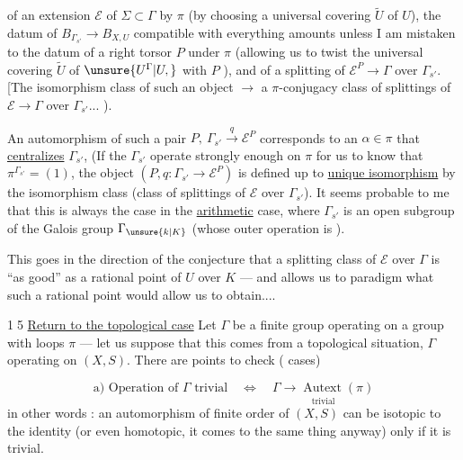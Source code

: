 
of an extension $\mathcal E$ of $\Sigma\subset\Gamma$ by $\pi$ (by choosing a universal covering $\widetilde U$ of $U$), the datum of $B_{\Gamma_{s'}}\longrightarrow B_{X,U}$ compatible with everything amounts unless I am mistaken to the datum of a right torsor $P$ under $\pi$ (allowing us to twist the  universal covering $\widetilde U$ of $\unsure{U^\Gamma|U,}$ with $P$  ), and of a splitting of $\mathcal E^P\longrightarrow\Gamma$ over $\Gamma_{s'}$.
[The isomorphism class of such an object $\longrightarrow$ a $\pi$-conjugacy class of splittings of $\mathcal E\longrightarrow\Gamma$ over $\Gamma_{s'}$... ).

An automorphism of such a pair  $P,\ \Gamma_{s'}\xrightarrow{q}\mathcal E^P$ corresponds to an $\alpha\in\pi$ that \uline{centralizes} $\Gamma_{s'}$,  (If the $\Gamma_{s'}$ operate strongly enough on $\pi$ for us to know that $\pi^{\Gamma_{s'}}=(1)$, the object $(P,q:\Gamma_{s'}\longrightarrow\mathcal E^P)$ is defined up to \uline{unique isomorphism} by the isomorphism class  (class of splittings of $\mathcal E$ over $\Gamma_{s'}$).
It seems probable to me that this is always the case in the \uline{arithmetic} case, where $\Gamma_{s'}$ is an open subgroup of the Galois group $\Gamma_{\unsure{k|K}}$ (whose outer operation is ).


This goes in the direction of the conjecture that a splitting class of $\mathcal E$ over $\Gamma$ is ``as good'' as a rational point of $U$ over $K$ --- and allows us to paradigm what such a rational point would allow us to obtain....

\textcircled{15} \uline{Return to the topological case} Let $\Gamma$ be a finite group operating on a group with loops $\pi$ --- let us suppose that this comes from a topological situation, $\Gamma$ operating on $(X,S)$. There are points to check (\uline{} cases)

\[
\text{a) Operation of }\Gamma\text{ trivial}
\quad\Longleftrightarrow\quad
\underset{\text{trivial}}{\Gamma\longrightarrow\operatorname{Autext}(\pi)}
\]
in other words : an automorphism of finite order of $(X,S)$ can be isotopic to the identity (or even  homotopic, it comes to the same thing anyway) only if it is trivial.

